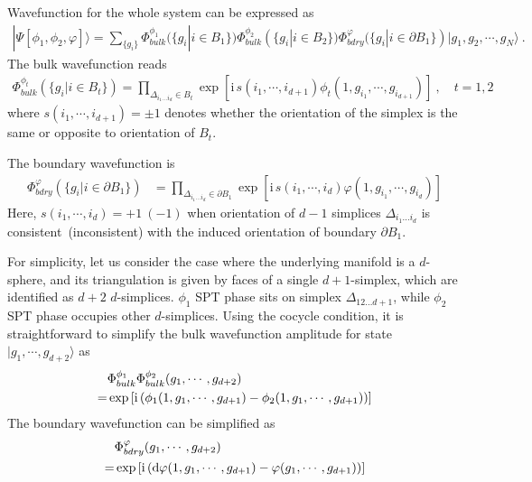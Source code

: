 \documentclass[%
 reprint,
 amsmath,amssymb,
 aps,pra,
]{revtex4-1}
\newcommand{\dd}{\mathrm{d}} %
\newcommand{\ii}{\mathrm{i}\,} %
\begin{document}
\begin{widetext}
Wavefunction for the whole system can be expressed as
\begin{align}
  |\Psi[\phi_1,\phi_2,\varphi]\rangle=\sum_{\{g_i\}}\Phi_{bulk}^{\phi_1}(\{g_i|i\in B_1\}) \Phi_{bulk}^{\phi_2}(\{g_i|i\in B_2\})
  \Phi_{bdry}^{\varphi}(\{g_i|i\in \partial B_1\})|g_1,g_2,\cdots,g_N\rangle~.
  \label{}
\end{align}
The bulk wavefunction reads
\begin{align}
  \Phi_{bulk}^{\phi_t}(\{g_i|i\in B_t\})=\prod_{\Delta_{i_1\ldots i_d}\in B_t}\exp\left[ \ii s(i_1,\cdots,i_{d+1})\phi_t(1,g_{i_1},\cdots,g_{i_{d+1}})\right]~,\quad t=1,2
  \label{}
\end{align}
where $s(i_1,\cdots,i_{d+1})=\pm1$ denotes whether the orientation of the simplex is the same or opposite to orientation of $B_t$.

The boundary wavefunction is
\begin{align}
  \Phi_{bdry}^{\varphi}(\{g_i|i\in \partial B_1\})&=\prod_{\Delta_{i_1\ldots i_{d}}\in \partial B_1}\exp\left[ \ii s(i_1,\cdots,i_{d})\varphi(1,g_{i_1},\cdots,g_{i_{d}})\right]
  \label{}
\end{align}
Here, $s(i_1,\cdots,i_{d})=+1~(-1)$ when orientation of $d-1$ simplices $\Delta_{i_1\ldots i_{d}}$ is consistent~(inconsistent) with the induced orientation of boundary $\partial B_1$.
\end{widetext}
For simplicity, let us consider the case where the underlying manifold is a $d$-sphere, and its triangulation is given by faces of a single $d+1$-simplex, which are identified as $d+2$ $d$-simplices.
$\phi_1$ SPT phase sits on simplex $\Delta_{12\ldots {d+1}}$, while $\phi_2$ SPT phase occupies other $d$-simplices.
Using the cocycle condition, it is straightforward to simplify the bulk wavefunction amplitude for state $|g_1,\cdots,g_{d+2}\rangle$ as
\begin{align}
  &\Phi_{bulk}^{\phi_1}\Phi_{bulk}^{\phi_2}(g_1,\cdots,g_{d+2})\notag\\
  =&\exp\left[ \ii (\phi_1(1,g_1,\cdots,g_{d+1})-\phi_2(1,g_1,\cdots,g_{d+1})) \right]
  \label{eq:bulk_spt_wf}
\end{align}
The boundary wavefunction can be simplified as
\begin{align}
  &\Phi_{bdry}^\varphi(g_1,\cdots,g_{d+2})\notag\\
  =&\exp\left[ \ii (\dd\varphi(1,g_1,\cdots,g_{d+1})-\varphi(g_1,\cdots,g_{d+1}) ) \right]
  \label{eq:bdry_spt_wf}
\end{align}
\end{document}

